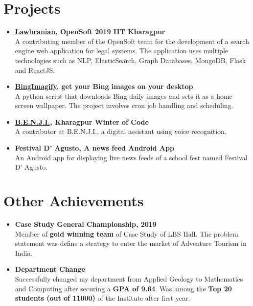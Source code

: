 \documentclass[a4paper,10pt]{article} %
\begin{document}

\section{\textcolor{sectiontitle}{Projects}}
\begin{itemize}
    \item \textbf{\href{https://github.com/lbs-iitkgp/Opensoft-2019}{Lawbranian}, OpenSoft 2019 IIT Kharagpur}\\
    A contributing member of the OpenSoft team for the development of a search engine web application for legal systems. The application uses multiple technologies such as NLP, ElasticSearch, Graph Databases, MongoDB, Flask and ReactJS.
    \item \textbf{\href{https://github.com/aribalam/BingImagify}{BingImagify}, get your Bing images on your desktop}\\
    A python script that downloads Bing daily images and sets it as a home screen wallpaper. The project involves cron job handling and scheduling.
    \item \textbf{\href{https://github.com/the-ethan-hunt/B.E.N.J.I.}{B.E.N.J.I.}, Kharagpur Winter of Code}\\
    A contributor at B.E.N.J.I., a digital assistant using voice recognition.
    \item \textbf{Festival D' Agusto, A news feed Android App}\\
    An Android app for displaying live news feeds of a school fest named Festival D' Agusto.
\end{itemize}


\section{\textcolor{sectiontitle}{Other Achievements}}
\begin{itemize}
    \item \textbf{Case Study General Championship, 2019}\\
    Member of \textbf{gold winning team} of Case Study of LBS Hall. The problem statement was define a strategy to enter the market of Adventure Tourism in India.
    \item \textbf{Department Change}\\
    Successfully changed my department from Applied Geology to Mathematics and Computing after securing a \textbf{GPA of 9.64}. Was among the \textbf{Top 20 students (out of 11000)} of the Institute after first year.
\end{itemize}
\end{document}
